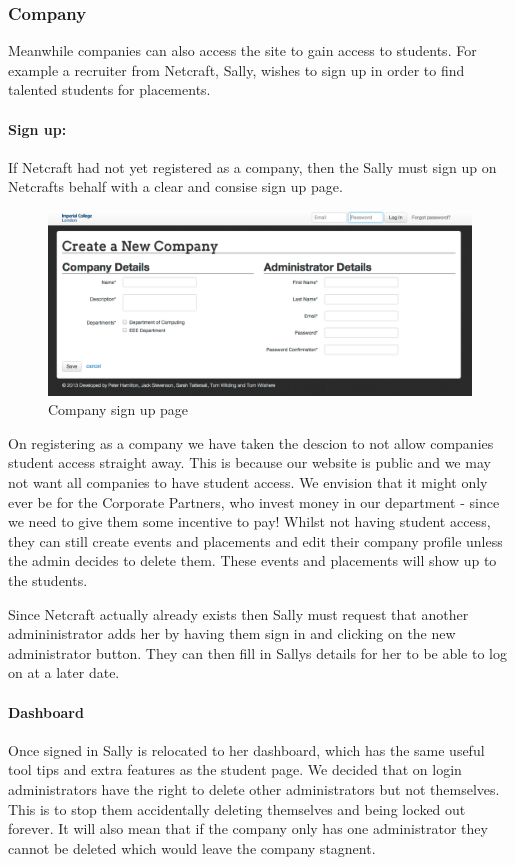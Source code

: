 \subsubsection{Company}
Meanwhile companies can also access the site to gain access to students. For example a recruiter from Netcraft, Sally, wishes to sign up in order to find talented students for placements.
  \paragraph{Sign up:}
    If Netcraft had not yet registered as a company, then the Sally must sign up on Netcrafts behalf with a clear and consise sign up page.

    \begin{figure}[H]\centering
    \includegraphics[scale=0.3]{images/user_experiences/company/company_signup}
    \caption{Company sign up page}
    \end{figure}

    On registering as a company we have taken the descion to not allow companies student access straight away. This is because our website is public and we may not want all companies to have student access. We envision that it might only ever be for the Corporate Partners, who invest money in our department - since we need to give them some incentive to pay!
    Whilst not having student access, they can still create events and placements and edit their company profile unless the admin decides to delete them. These events and placements will show up to the students.


    Since Netcraft actually already exists then Sally must request that another admininistrator adds her by having them sign in and clicking on the new administrator button. They can then fill in Sallys details for her to be able to log on at a later date.

  \paragraph{Dashboard}
    Once signed in Sally is relocated to her dashboard, which has the same useful tool tips and extra features as the student page.
    We decided that on login administrators have the right to delete other administrators but not themselves. This is to stop them accidentally deleting themselves and being locked out forever. It will also mean that if the company only has one administrator they cannot be deleted which would leave the company stagnent.

